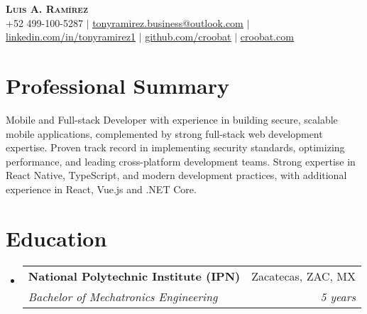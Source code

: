 \documentclass[letterpaper,11pt]{article}
\makeatletter
\newcommand{\resumeSubheading}[4]{
  \vspace{4pt}\item
    \begin{tabular*}{0.97\textwidth}[t]{l@{\extracolsep{\fill}}r}
      \textbf{#1} & #2 \\
      \textit{\small#3} & \textit{\small #4} \\
    \end{tabular*}\vspace{-2pt}
}
\newcommand{\resumeSubHeadingListStart}{\begin{itemize}[leftmargin=0.15in, label={}]}
\newcommand{\resumeSubHeadingListEnd}{\end{itemize}}
\makeatother
\begin{document}
\begin{center}
    \textbf{\Huge \scshape Luis A. Ramírez} \\ \vspace{1pt}
    \small +52 499-100-5287 $|$ \href{tonyramirez.business@outlook.com}{\underline{tonyramirez.business@outlook.com}} $|$
    \href{https://linkedin.com/in/tonyramirez1}{\underline{linkedin.com/in/tonyramirez1}} $|$
    \href{https://github.com/croobat}{\underline{github.com/croobat}} $|$
    \href{https://croobat.com}{\underline{croobat.com}}
\end{center}

\section{Professional Summary}
\begin{itemize}[leftmargin=0.15in, label={}]
\small{
\item{Mobile and Full-stack Developer with experience in building secure, scalable mobile applications, complemented by strong full-stack web development expertise. Proven track record in implementing security standards, optimizing performance, and leading cross-platform development teams. Strong expertise in React Native, TypeScript, and modern development practices, with additional experience in React, Vue.js and .NET Core.}
}
\end{itemize}

\section{Education}
  \resumeSubHeadingListStart
    \resumeSubheading
      {National Polytechnic Institute (IPN)} {Zacatecas, ZAC, MX}
      {Bachelor of Mechatronics Engineering}{5 years}
  \resumeSubHeadingListEnd

\end{document}
